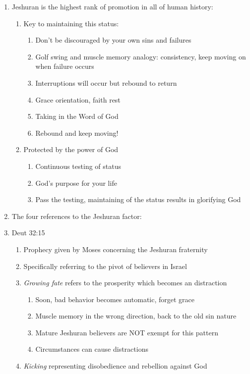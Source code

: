 \documentclass[11pt]{article}
\begin{document}
\begin{enumerate}
\begin{enumerate}
	\end{enumerate}
	\item Jeshuran is the highest rank of promotion in all of human history:
	\begin{enumerate}
		\item Key to maintaining this status:
		\begin{enumerate}
			\item Don't be discouraged by your own sins and failures
			\item Golf swing and muscle memory analogy: consistency, keep moving on when failure occurs
			\item Interruptions will occur but rebound to return
			\item Grace orientation, faith rest
			\item Taking in the Word of God
			\item Rebound and keep moving!
		\end{enumerate}
		\item Protected by the power of God
		\begin{enumerate}
			\item Continuous testing of status
			\item God's purpose for your life
			\item Pass the testing, maintaining of the status results in glorifying God
		\end{enumerate}
	\end{enumerate}
	\item The four references to the Jeshuran factor:
	\item Deut 32:15
	\begin{enumerate}
		\item Prophecy given by Moses concerning the Jeshuran fraternity
		\item Specifically referring to the pivot of believers in Israel
		\item \emph{Growing fate} refers to the prosperity which becomes an distraction
		\begin{enumerate}
			\item Soon, bad behavior becomes automatic, forget grace
			\item Muscle memory in the wrong direction, back to the old sin nature
			\item Mature Jeshuran believers are NOT exempt for this pattern
			\item Circumstances can cause distractions
		\end{enumerate}
		\item \emph{Kicking} representing disobedience and rebellion against God

\end{enumerate}
\end{enumerate}
\end{document}

